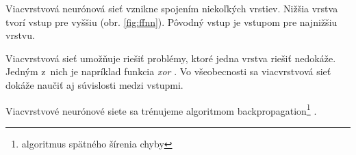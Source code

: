 Viacvrstvová neurónová sieť vznikne spojením niekoľkých vrstiev. Nižšia vrstva tvorí vstup pre vyššiu (obr. \ref{fig:ffnn}). Pôvodný vstup je vstupom pre najnižšiu vrstvu.

Viacvrstvová sieť umožňuje riešiť problémy, ktoré jedna vrstva riešiť nedokáže. Jedným z~nich je napríklad funkcia \textit{xor} \cite[s. 197]{haykin1999neural}. Vo všeobecnosti sa viacvrstvová sieť dokáže naučiť aj súvislosti medzi vstupmi.

Viacvrstvové neurónové siete sa trénujeme algoritmom backpropagation\footnote{algoritmus spätného šírenia chyby} \cite{haykin1999neural,dominika2011neural}.

%






